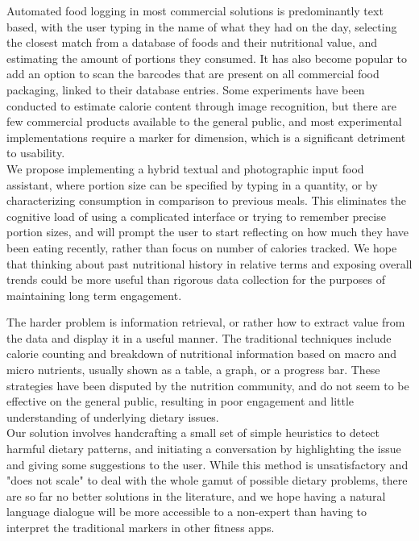 Automated food logging in most commercial solutions is predominantly text based, with the user typing in the name of what they had on the day, selecting the closest match from a database of foods and their nutritional value, and estimating the amount of portions they consumed. It has also become popular to add an option to scan the barcodes that are present on all commercial food packaging, linked to their database entries. Some experiments have been conducted to estimate calorie content through image recognition, but there are few commercial products available to the general public, and most experimental implementations require a marker for dimension, which is a significant detriment to usability. \\
We propose implementing a hybrid textual and photographic input food assistant, where portion size can be specified by typing in a quantity, or by characterizing consumption in comparison to previous meals. This eliminates the cognitive load of using a complicated interface or trying to remember precise portion sizes, and will prompt the user to start reflecting on how much they have been eating recently, rather than focus on number of calories tracked. We hope that thinking about past nutritional history in relative terms and exposing overall trends could be more useful than rigorous data collection for the purposes of maintaining long term engagement.

The harder problem is information retrieval, or rather how to extract value from the data and display it in a useful manner. The traditional techniques include calorie counting and breakdown of nutritional information based on macro and micro nutrients, usually shown as a table, a graph, or a progress bar. These strategies have been disputed by the nutrition community, and do not seem to be effective on the general public, resulting in poor engagement and little understanding of underlying dietary issues. \\
Our solution involves handcrafting a small set of simple heuristics to detect harmful dietary patterns, and initiating a conversation by highlighting the issue and giving some suggestions to the user. While this method is unsatisfactory and "does not scale" to deal with the whole gamut of possible dietary problems, there are so far no better solutions in the literature, and we hope having a natural language dialogue will be more accessible to a non-expert than having to interpret the traditional markers in other fitness apps. 

